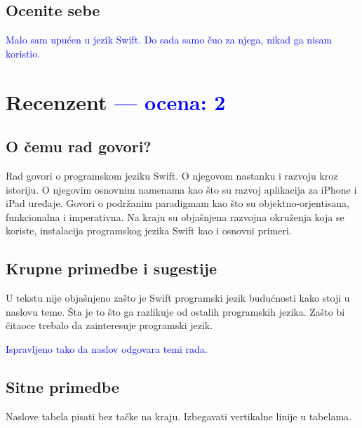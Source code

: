 \documentclass[a4paper]{report}
\newcommand{\odgovor}[1]{\textcolor{blue}{#1}}
\begin{document}
\section{Ocenite sebe}
\odgovor {Malo sam upućen u jezik Swift. Do sada samo čuo za njega, nikad ga nisam koristio.}

\chapter{Recenzent \odgovor{--- ocena: 2} }


\section{O čemu rad govori?}
Rad govori o programskom jeziku Swift. O njegovom nastanku i razvoju kroz istoriju.
O njegovim osnovnim namenama kao što su razvoj aplikacija za iPhone i iPad uređaje.
Govori o podržanim paradigmam kao što su objektno-orjentisana, funkcionalna i imperativna.
Na kraju su objašnjena razvojna okruženja koja se koriste, instalacija programskog jezika Swift kao i osnovni primeri.

\section{Krupne primedbe i sugestije}
U tekstu nije objašnjeno zašto je Swift programski jezik budućnosti kako stoji u naslovu teme.
Šta je to što ga razlikuje od ostalih programskih jezika.
Zašto bi čitaoce trebalo da zainteresuje programski jezik. 

\odgovor{Ispravljeno tako da naslov odgovara temi rada.}

\section{Sitne primedbe}

Naslove tabela pisati bez tačke na kraju.
Izbegavati vertikalne linije u tabelama.
\end{document}
